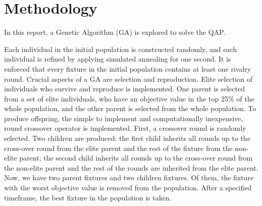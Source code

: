 \section{Methodology}
In this report, a Genetic Algorithm (GA) is explored to solve the QAP. %

\bigskip
Each individual in the initial population is constructed randomly, and each individual is refined by applying simulated annealing for one second. It is enforced that every fixture in the initial population contains at least one rivalry round. Crucial aspects of a GA are selection and reproduction. Elite selection of individuals who survive and reproduce is implemented. One parent is selected from a set of elite individuals, who have an objective value in the top 25\% of the whole population, and the other parent is selected from the whole population. To produce offspring, the simple to implement and computationally inexpensive, round crossover operator is implemented. First, a crossover round is randomly selected. Two children are produced: the first child inherits all rounds up to the cross-over round from the elite parent and the rest of the fixture from the non-elite parent; the second child inherits all rounds up to the cross-over round from the non-elite parent and the rest of the rounds are inherited from the elite parent. Now, we have two parent fixtures and two children fixtures. Of them, the fixture with the worst objective value is removed from the population. After a specified timeframe, the best fixture in the population is taken. 


